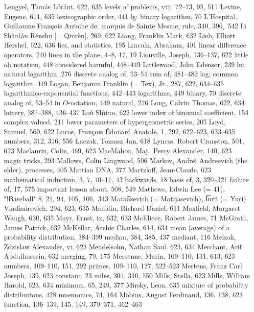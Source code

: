 Lengyel, Tam\'as L\'or\'ant, 622, 635
levels of problems, viii, 72--73, 95, 511
Levine, Eugene, 611, 635
lexicographic order, 441
lg: binary logarithm, 70
L'Hospital, Guillaume Fran\c{c}ois Antoine de, marquis de Sainte Mesme, %
  rule, 340, 396,~542
L\u{\i} Sh\`anl\'an R\'ensh\=u [= Qi\=ur\`en], 269, 622
Liang, Franklin Mark, 632
Lieb, Elliott Hershel, 622, 636
lies, and statistics, 195
Lincoln, Abraham, 401
linear difference operators, 240
lines in the plane, 4--8, 17, 19
Liouville, Joseph, 136--137, 622
little oh notation, 448
\sub considered harmful, 448--449
Littlewood, John Edensor, 239
ln: natural logarithm, 276
\sub discrete analog of, 53--54
\sub sum of, 481--482
log: common logarithm, 449
Logan, Benjamin Franklin (= Tex), Jr., 287, 622, 634--635
logarithmico-exponential functions, 442--443
logarithms, 449
\sub binary, 70
\sub discrete analog of, 53--54
\sub in $O$-notation, 449
\sub natural, 276
Long, Calvin Thomas, 622, 634
lottery, 387--388, 436--437
Lo\'u Sh\`{\i}t\=uo, 622
lower index of binomial coefficient, 154
\sub complex valued, 211
lower parameters of hypergeometric series, 205
Loyd, Samuel, 560, 622
Lucas, Fran\c cois \'Edouard Anatole, 1, 292, 622--623, 633--635
\sub numbers, 312, 316, 556
\L uczak, Tomasz Jan, 618
Lyness, Robert Cranston, 501, 623
\medskip
Maclaurin, Colin, 469, 623
MacMahon, Maj.~Percy Alexander, 140, 623
magic tricks, 293
Mallows, Colin Lingwood, 506
Markov, Andre{\u\i} Andreevich (the elder), processes, 405
Martian DNA, 377
Martzloff, Jean-Claude, 623
mathematical induction, 3, 7, 10--11, 43
\sub backwards, 18
\sub basis of, 3, 320--321
\sub failure of, 17, 575
\sub important lesson about, 508, 549
Mathews, Edwin Lee (= 41), "!Baseball" 8, 21, 94, 105, 106,~343
Mati{\t\i}asevich (= Matijasevich), \t{I}uri{\u\i} (= Yuri) Vladimirovich, %
 294, 623, 635
Mauldin, Richard Daniel, 611
Maxfield, Margaret Waugh, 630, 635
Mayr, Ernst, ix, 632, 633
McEliece, Robert James, 71
McGrath, James Patrick, 632
McKellar, Archie Charles, 614, 634
mean (average) of a probability distribution, 384--399
median, 384, 385, 437
mediant, 116
Melzak, Zdzislaw Alexander, vi, 623
Mendelsohn, Nathan Saul, 623, 634
Merchant, Arif Abdulhussein, 632
merging, 79, 175
Mersenne, Marin, 109--110, 131, 613, 623
\sub numbers, 109--110, 151, 292
\sub primes, 109--110, 127, 522--523
Mertens, Franz Carl Joseph, 139, 623
\sub constant, 23
miles, 301, 310, 550
Mills, Stella, 623
Mills, William Harold, 623, 634
minimum, 65, 249, 377
Mirsky, Leon, 635
mixture of probability distributions, 428
mnemonics, 74, 164
M\"obius, August Ferdinand, 136, 138, 623
\sub function, 136--139, 145, 149, 370--371, 462--463
